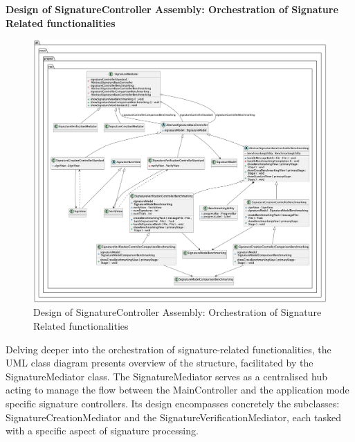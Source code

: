 \documentclass[]{final_report}
\theoremstyle{definition}
\begin{document}
\textbf{Design of SignatureController Assembly: Orchestration of Signature Related functionalities}

\begin{figure}[H]
    \centering
    \includegraphics[width=1.2\textwidth]{main_pictures/signatureController.png}
    \caption{Design of SignatureController Assembly: Orchestration of Signature Related functionalities}
    \label{fig:SIGCONTROLLERDESIGN}
\end{figure}
Delving deeper into the orchestration of signature-related functionalities, the UML class diagram presents overview of the structure, facilitated by the SignatureMediator class.  
The SignatureMediator serves as a centralised hub acting to manage the flow between the MainController and the application mode specific signature controllers. Its design encompasses concretely the subclasses: SignatureCreationMediator and the SignatureVerificationMediator, each tasked with a specific aspect of signature processing.
\end{document}
